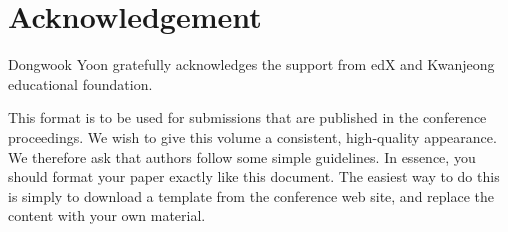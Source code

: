 \documentclass{sigchi}
\begin{document}
\section{Acknowledgement} 
Dongwook Yoon gratefully acknowledges the support from edX and Kwanjeong educational foundation.

This format is to be used for submissions that are
published in the conference proceedings.  We wish to give
this volume a consistent, high-quality appearance. We
therefore ask that authors follow some simple
guidelines. In essence, you should format your paper
exactly like this document. The easiest way to do this is
simply to download a template from the conference web
site, and replace the content with your own material.




\end{document}
